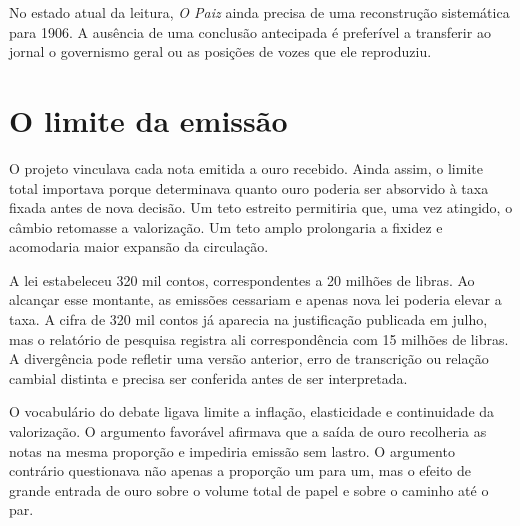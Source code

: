 
No estado atual da leitura, \textit{O Paiz} ainda precisa de uma reconstrução sistemática para 1906. A ausência de uma conclusão antecipada é preferível a transferir ao jornal o governismo geral ou as posições de vozes que ele reproduziu.


\section{O limite da emissão}

O projeto vinculava cada nota emitida a ouro recebido. Ainda assim, o limite total importava porque determinava quanto ouro poderia ser absorvido à taxa fixada antes de nova decisão. Um teto estreito permitiria que, uma vez atingido, o câmbio retomasse a valorização. Um teto amplo prolongaria a fixidez e acomodaria maior expansão da circulação.

A lei estabeleceu 320 mil contos, correspondentes a 20 milhões de libras. Ao alcançar esse montante, as emissões cessariam e apenas nova lei poderia elevar a taxa. A cifra de 320 mil contos já aparecia na justificação publicada em julho, mas o relatório de pesquisa registra ali correspondência com 15 milhões de libras. A divergência pode refletir uma versão anterior, erro de transcrição ou relação cambial distinta e precisa ser conferida antes de ser interpretada.


O vocabulário do debate ligava limite a inflação, elasticidade e continuidade da valorização. O argumento favorável afirmava que a saída de ouro recolheria as notas na mesma proporção e impediria emissão sem lastro. O argumento contrário questionava não apenas a proporção um para um, mas o efeito de grande entrada de ouro sobre o volume total de papel e sobre o caminho até o par.

